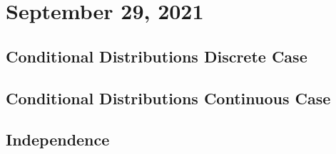 \section{September 29, 2021}
\subsection{Conditional Distributions Discrete Case}
\subsection{Conditional Distributions Continuous Case}
\subsection{Independence}